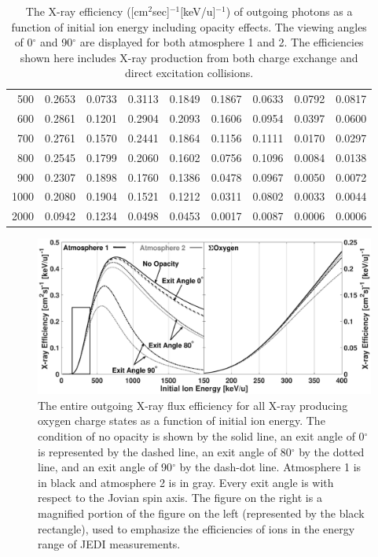 \documentclass[draft]{agujournal2018}
\begin{document}
\begin{table}[ht]
\begin{tabular}{r|c|c|c|c|c|c|c|c}
    500      & 0.2653 & 0.0733 & 0.3113	& 0.1849 & 0.1867 & 0.0633 & 0.0792 & 0.0817 \\
    600      & 0.2861 & 0.1201 & 0.2904	& 0.2093 & 0.1606 & 0.0954 & 0.0397 & 0.0600 \\
    700      & 0.2761 & 0.1570 & 0.2441	& 0.1864 & 0.1156 & 0.1111 & 0.0170 & 0.0297 \\
    800      & 0.2545 & 0.1799 & 0.2060	& 0.1602 & 0.0756 & 0.1096 & 0.0084 & 0.0138 \\
    900      & 0.2307 & 0.1898 & 0.1760	& 0.1386 & 0.0478 & 0.0967 & 0.0050 & 0.0072 \\
    1000     & 0.2080 & 0.1904 & 0.1521	& 0.1212 & 0.0311 & 0.0802 & 0.0033 & 0.0044 \\
    2000     & 0.0942 & 0.1234 & 0.0498	& 0.0453 & 0.0017 & 0.0087 & 0.0006 & 0.0006 \\
    \hline
    \end{tabular}
    \caption{The X-ray efficiency ([cm$^2$sec]$^{-1}$[keV/u]$^{-1}$) of outgoing photons as a function of initial ion energy including opacity effects. The viewing angles of 0$^\circ$ and 90$^\circ$ are displayed for both atmosphere 1 and 2. The efficiencies shown here includes X-ray production from both charge exchange and direct excitation collisions.}
    \label{tab:XrayEff}
\end{table}

\begin{figure}[ht]
    \centering
    \includegraphics[width=\textwidth]{Figures/OxyXrayEff2.eps}
    \caption{The entire outgoing X-ray flux efficiency for all X-ray producing oxygen charge states as a function of initial ion energy. The condition of no opacity is shown by the solid line, an exit angle of 0$^{\circ}$ is represented by the dashed line, an exit angle of 80$^{\circ}$ by the dotted line, and an exit angle of 90$^{\circ}$ by the dash-dot line. Atmosphere 1 is in black and atmosphere 2 is in gray. Every exit angle is with respect to the Jovian spin axis. The figure on the right is a magnified portion of the figure on the left (represented by the black rectangle), used to emphasize the efficiencies of ions in the energy range of JEDI measurements.}
    \label{fig:OxyXrayEff}
\end{figure}
\end{document}
